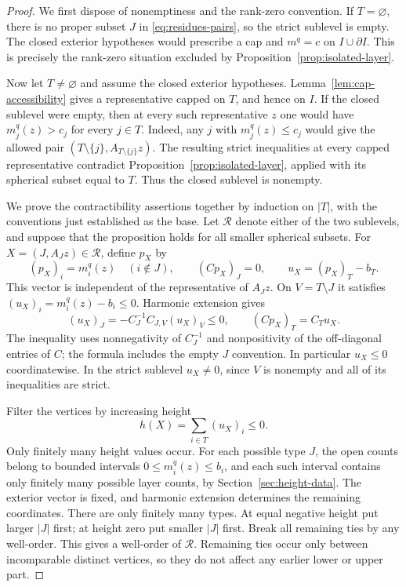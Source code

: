 \begin{proof}
We first dispose of nonemptiness and the rank-zero convention.  If
$T=\varnothing$, there is no proper subset $J$ in
\eqref{eq:residues-pairs}, so the strict sublevel is empty.  The
closed exterior hypotheses would prescribe a cap and $m^q=c$ on
$I\cup\partial I$.  This is precisely the rank-zero situation
excluded by Proposition~\ref{prop:isolated-layer}.

Now let $T\ne\varnothing$ and assume the closed exterior hypotheses.
Lemma~\ref{lem:cap-accessibility} gives a representative capped on
$T$, and hence on $I$.  If the closed sublevel were empty, then at
every such representative $z$ one would have $m_j^q(z)>c_j$ for
every $j\in T$.  Indeed, any $j$ with $m_j^q(z)\le c_j$ would give
the allowed pair $(T\setminus\{j\},A_{T\setminus\{j\}}z)$.
The resulting strict inequalities at every capped representative
contradict Proposition~\ref{prop:isolated-layer}, applied with its
spherical subset equal to $T$.  Thus the closed sublevel is nonempty.

We prove the contractibility assertions together by induction on
$|T|$, with the conventions just established as the base.  Let
$\mathcal R$ denote either of the two sublevels, and suppose that the
proposition holds for all smaller spherical subsets.  For
$X=(J,A_Jz)\in\mathcal R$, define $p_X$ by
\[
 (p_X)_i=m_i^q(z)\quad(i\notin J),\qquad (Cp_X)_J=0,
 \qquad u_X=(p_X)_T-b_T.
\]
This vector is independent of the representative of $A_Jz$.
On $V=T\setminus J$ it satisfies
$(u_X)_i=m_i^q(z)-b_i\le0$.  Harmonic extension gives
\begin{equation}
 \label{eq:residues-harmonic-difference}
 (u_X)_J=-C_J^{-1}C_{J,V}(u_X)_V\le0,
 \qquad (Cp_X)_T=C_Tu_X.
\end{equation}
The inequality uses nonnegativity of $C_J^{-1}$ and nonpositivity
of the off-diagonal entries of $C$; the formula includes the empty
$J$ convention.  In particular $u_X\le0$ coordinatewise.  In the
strict sublevel $u_X\ne0$, since $V$ is nonempty and all of its
inequalities are strict.

Filter the vertices by increasing height
\[
 h(X)=\sum_{i\in T}(u_X)_i\le0.
\]
Only finitely many height values occur.  For each possible type $J$,
the open counts belong to bounded intervals $0\le m_i^q(z)\le b_i$,
and each such interval contains only finitely many possible layer
counts, by Section~\ref{sec:height-data}.  The exterior vector is
fixed, and harmonic extension determines the remaining coordinates.
There are only finitely many types.  At equal negative height put
larger $|J|$ first; at height zero put smaller $|J|$ first.  Break all
remaining ties by any well-order.  This gives a well-order of
$\mathcal R$.  Remaining ties occur only between incomparable
distinct vertices, so they do not affect any earlier lower or upper
part.


\end{proof}
